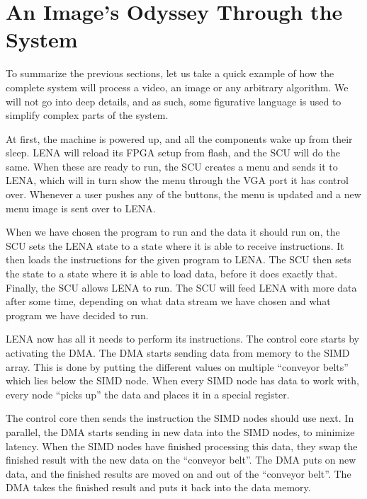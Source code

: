 \section{An Image's Odyssey Through the System}

To summarize the previous sections, let us take a quick example of how the
complete system will process a video, an image or any arbitrary algorithm. 
We will not go into deep details, and as such, some figurative language is
used to simplify complex parts of the system.

At first, the machine is powered up, and all the components wake up from their
sleep. \ac{LENA} will reload its \ac{FPGA} setup from flash, and the \ac{SCU}
will do the same. When these are ready to run, the \ac{SCU} creates a menu and
sends it to \ac{LENA}, which will in turn show the menu through the \ac{VGA} port
it has control over. Whenever a user pushes any of the buttons, the menu is
updated and a new menu image is sent over to \ac{LENA}.

When we have chosen the program to run and the data it should run on, the
\ac{SCU} sets the \ac{LENA} state to a state where it is able to receive
instructions. It then loads the instructions for the given program to
\ac{LENA}. The \ac{SCU} then sets the state to a state where it is able to load
data, before it does exactly that. Finally, the \ac{SCU} allows \ac{LENA} to run. The
  \ac{SCU} will feed \ac{LENA} with more data after some time, depending on what
  data stream we have chosen and what program we have decided to run.



\ac{LENA} now has all it needs to perform its instructions. The control core
starts by activating the \ac{DMA}. The \ac{DMA} starts sending data from memory
to the \ac{SIMD} array. This is done by putting the different values on multiple
``conveyor belts'' which lies below the \ac{SIMD} node. When every \ac{SIMD}
node has data to work with, every node ``picks up'' the data and places it in a
special register.

The control core then sends the instruction the \ac{SIMD} nodes should use
next. In parallel, the \ac{DMA} starts sending in new data into the \ac{SIMD}
nodes, to minimize latency. When the \ac{SIMD} nodes have finished processing
this data, they swap the finished result with the new data on the ``conveyor
belt''. The \ac{DMA} puts on new data, and the finished results are moved on and
out of the ``conveyor belt''. The \ac{DMA} takes the finished result and puts it
back into the data memory.

